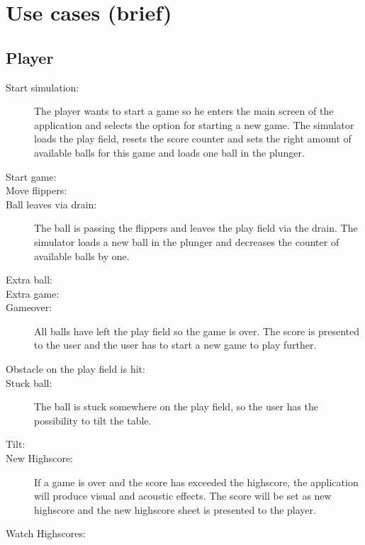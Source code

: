 \documentclass[fontsize=12pt,
               paper=a4,
               twoside=false,
               parskip=half,
               ]{scrartcl}
\begin{document}


\section{Use cases (brief)}

\subsection{Player}

\begin{description}

\item[Start simulation:]   The player wants to start a game so he enters the main screen of the application and selects the option for starting a new game. The simulator loads the play field, resets the score counter and sets the right amount of available balls for this game and loads one ball in the plunger.

\item[Start game:]

\item[Move flippers:]


\item[Ball leaves via drain:] The ball is passing the flippers and leaves the play field via the drain. The simulator loads a new ball in the plunger and decreases the counter of available balls by one.

\item[Extra ball:] 

\item[Extra game:]

\item[Gameover:] All balls have left the play field so the game is over. The score is presented to the user and the user has to start a new game to play further.

\item[Obstacle on the play field is hit:]

\item[Stuck ball:] The ball is stuck somewhere on the play field, so the user has the possibility to tilt the table.

\item[Tilt:]

\item[New Highscore:] If a game is over and the score has exceeded the highscore, the application will produce visual and acoustic effects. The score will be set as new highscore and the new highscore sheet is presented to the player.

\item[Watch Highscores:] 

\end{description}
\end{document}
